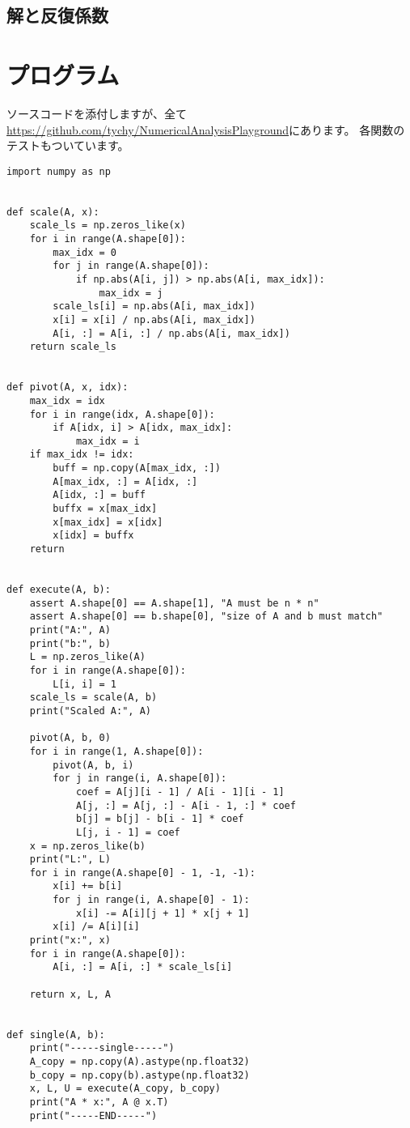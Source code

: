 \documentclass{jsarticle}
\begin{document}
\subsection{解と反復係数}
\section{プログラム}
ソースコードを添付しますが、全て
\href{https://github.com/tychy/NumericalAnalysisPlayground}{https://github.com/tychy/NumericalAnalysisPlayground}にあります。
各関数のテストもついています。
\begin{lstlisting}[caption=スクリプトファイル名,label=参照ラベル]
import numpy as np


def scale(A, x):
    scale_ls = np.zeros_like(x)
    for i in range(A.shape[0]):
        max_idx = 0
        for j in range(A.shape[0]):
            if np.abs(A[i, j]) > np.abs(A[i, max_idx]):
                max_idx = j
        scale_ls[i] = np.abs(A[i, max_idx])
        x[i] = x[i] / np.abs(A[i, max_idx])
        A[i, :] = A[i, :] / np.abs(A[i, max_idx])
    return scale_ls


def pivot(A, x, idx):
    max_idx = idx
    for i in range(idx, A.shape[0]):
        if A[idx, i] > A[idx, max_idx]:
            max_idx = i
    if max_idx != idx:
        buff = np.copy(A[max_idx, :])
        A[max_idx, :] = A[idx, :]
        A[idx, :] = buff
        buffx = x[max_idx]
        x[max_idx] = x[idx]
        x[idx] = buffx
    return


def execute(A, b):
    assert A.shape[0] == A.shape[1], "A must be n * n"
    assert A.shape[0] == b.shape[0], "size of A and b must match"
    print("A:", A)
    print("b:", b)
    L = np.zeros_like(A)
    for i in range(A.shape[0]):
        L[i, i] = 1
    scale_ls = scale(A, b)
    print("Scaled A:", A)

    pivot(A, b, 0)
    for i in range(1, A.shape[0]):
        pivot(A, b, i)
        for j in range(i, A.shape[0]):
            coef = A[j][i - 1] / A[i - 1][i - 1]
            A[j, :] = A[j, :] - A[i - 1, :] * coef
            b[j] = b[j] - b[i - 1] * coef
            L[j, i - 1] = coef
    x = np.zeros_like(b)
    print("L:", L)
    for i in range(A.shape[0] - 1, -1, -1):
        x[i] += b[i]
        for j in range(i, A.shape[0] - 1):
            x[i] -= A[i][j + 1] * x[j + 1]
        x[i] /= A[i][i]
    print("x:", x)
    for i in range(A.shape[0]):
        A[i, :] = A[i, :] * scale_ls[i]

    return x, L, A


def single(A, b):
    print("-----single-----")
    A_copy = np.copy(A).astype(np.float32)
    b_copy = np.copy(b).astype(np.float32)
    x, L, U = execute(A_copy, b_copy)
    print("A * x:", A @ x.T)
    print("-----END-----")



\end{lstlisting}
\end{document}
